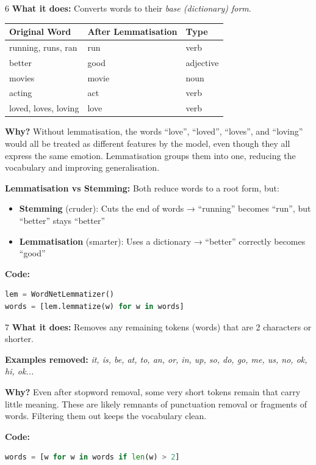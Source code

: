\documentclass[12pt, a4paper]{article}
\begin{document}
\begin{stepbox}[Lemmatisation]{6}
\textbf{What it does:} Converts words to their \emph{base (dictionary) form}.

\medskip
\begin{center}
\begin{tabular}{lll}
\textbf{Original Word} & \textbf{After Lemmatisation} & \textbf{Type} \\
\midrule
running, runs, ran & run & verb \\
better & good & adjective \\
movies & movie & noun \\
acting & act & verb \\
loved, loves, loving & love & verb \\
\end{tabular}
\end{center}

\medskip
\textbf{Why?} Without lemmatisation, the words ``love'', ``loved'', ``loves'', and ``loving'' would all be treated as different features by the model, even though they all express the same emotion. Lemmatisation groups them into one, reducing the vocabulary and improving generalisation.

\medskip
\textbf{Lemmatisation vs Stemming:} Both reduce words to a root form, but:
\begin{itemize}
  \item \textbf{Stemming} (cruder): Cuts the end of words → ``running'' becomes ``run'', but ``better'' stays ``better''
  \item \textbf{Lemmatisation} (smarter): Uses a dictionary → ``better'' correctly becomes ``good''
\end{itemize}

\medskip
\textbf{Code:}
\begin{lstlisting}[language=Python]
lem = WordNetLemmatizer()
words = [lem.lemmatize(w) for w in words]
\end{lstlisting}
\end{stepbox}

\begin{stepbox}{7}
\textbf{What it does:} Removes any remaining tokens (words) that are 2 characters or shorter.

\medskip
\textbf{Examples removed:} \textit{it, is, be, at, to, an, or, in, up, so, do, go, me, us, no, ok, hi, ok...}

\medskip
\textbf{Why?} Even after stopword removal, some very short tokens remain that carry little meaning. These are likely remnants of punctuation removal or fragments of words. Filtering them out keeps the vocabulary clean.

\medskip
\textbf{Code:}
\begin{lstlisting}[language=Python]
words = [w for w in words if len(w) > 2]
\end{lstlisting}
\end{stepbox}
\end{document}
